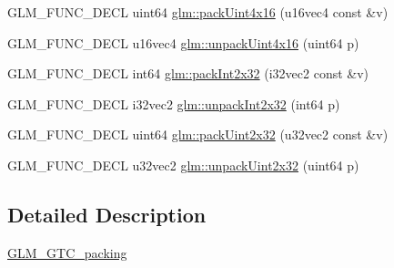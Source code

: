 \begin{DoxyCompactItemize}
\item 
G\+L\+M\+\_\+\+F\+U\+N\+C\+\_\+\+D\+E\+CL uint64 \hyperlink{group__gtc__packing_ga19813cb34dd7102f9612ba6c0d9ef377}{glm\+::pack\+Uint4x16} (u16vec4 const \&v)
\item 
G\+L\+M\+\_\+\+F\+U\+N\+C\+\_\+\+D\+E\+CL u16vec4 \hyperlink{group__gtc__packing_gaf1eea82404af955004aae19a2dcb55f1}{glm\+::unpack\+Uint4x16} (uint64 p)
\item 
G\+L\+M\+\_\+\+F\+U\+N\+C\+\_\+\+D\+E\+CL int64 \hyperlink{group__gtc__packing_ga1d6c24ff4f2b198eb2c4a2e4dcf7c336}{glm\+::pack\+Int2x32} (i32vec2 const \&v)
\item 
G\+L\+M\+\_\+\+F\+U\+N\+C\+\_\+\+D\+E\+CL i32vec2 \hyperlink{group__gtc__packing_ga6410b50fa48d15e70b2c34174ee4a3fc}{glm\+::unpack\+Int2x32} (int64 p)
\item 
G\+L\+M\+\_\+\+F\+U\+N\+C\+\_\+\+D\+E\+CL uint64 \hyperlink{group__gtc__packing_ga4c4e4d6ab81a6b14cf066b40b6967c0a}{glm\+::pack\+Uint2x32} (u32vec2 const \&v)
\item 
G\+L\+M\+\_\+\+F\+U\+N\+C\+\_\+\+D\+E\+CL u32vec2 \hyperlink{group__gtc__packing_gab211ea5f8cf86f00efa4fd53cb302c82}{glm\+::unpack\+Uint2x32} (uint64 p)
\end{DoxyCompactItemize}


\subsection{Detailed Description}
\hyperlink{group__gtc__packing}{G\+L\+M\+\_\+\+G\+T\+C\+\_\+packing} 